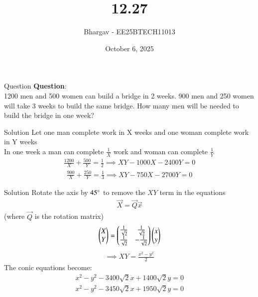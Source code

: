 \documentclass{beamer}
\title{12.27}
\date{October 6, 2025}
\author{Bhargav - EE25BTECH11013}
\begin{document}
\frame{\titlepage}

\begin{frame}{Question}
\textbf{Question}: \\
1200 men and 500 women can build a bridge in 2 weeks. 900 men and 250 women will take 3 weeks to build the same bridge. How many men will be needed to build the bridge in one week? \\
\end{frame}
\begin{frame}{Solution}
Let one man complete work in X weeks and one woman complete work in Y weeks\\
In one week a man can complete $\frac{1}{X}$ work and woman can complete $\frac{1}{Y}$
\begin{align}
\frac{1200}{X} + \frac{500}{Y} = \frac{1}{2} \implies XY - 1000X - 2400Y = 0 \label{eq:1}
\end{align}
\begin{align}
\frac{900}{X} + \frac{250}{Y} = \frac{1}{3} \implies XY - 750X - 2700Y = 0 \label{eq:2}
\end{align}

\end{frame}

\begin{frame}{Solution}
Rotate the axis by $45\degree$ to remove the $XY$ term in the equations
\begin{align}
\vec{X} = \vec{Q}\vec{x} 
\end{align}
(where $\vec{Q}$ is the rotation matrix)
\begin{align}
\begin{pmatrix}X \\ Y\end{pmatrix} = \begin{pmatrix}\frac{1}{\sqrt{2}} & \frac{1}{\sqrt{2}} \\ \frac{1}{\sqrt{2}} & -\frac{1}{\sqrt{2}}\end{pmatrix}\begin{pmatrix}x \\ y\end{pmatrix} \label{eq:3}
\end{align}
\begin{align}
\implies XY = \frac{x^2 - y^2}{2}
\end{align}
The conic equations become:
\begin{align}
x^2 - y^2 -3400\sqrt{2}x + 1400\sqrt{2}y = 0
\end{align}
\begin{align}
x^2 - y^2 - 3450\sqrt{2}x + 1950\sqrt{2}y = 0
\end{align}

\end{frame}
\end{document}
